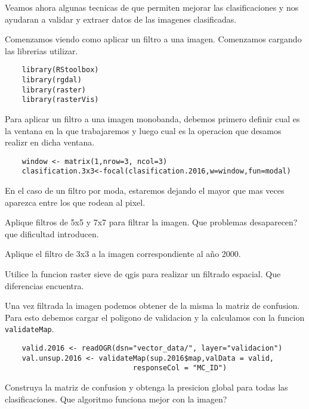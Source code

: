 Veamos ahora algunas tecnicas de que permiten mejorar las clasificaciones y nos
ayudaran a validar y extraer datos de las imagenes clasificadas.

Comenzamos viendo como aplicar un filtro a una imagen. Comenzamos cargando las
librerias utilizar.

\begin{lstlisting}
    library(RStoolbox)
    library(rgdal)
    library(raster)
    library(rasterVis)
\end{lstlisting}

Para aplicar un filtro a una imagen monobanda, debemos primero definir cual es
la ventana en la que trabajaremos y luego cual es la operacion que desamos
realizr en dicha ventana.

\begin{lstlisting}
    window <- matrix(1,nrow=3, ncol=3)
    clasification.3x3<-focal(clasification.2016,w=window,fun=modal)
\end{lstlisting}

En el caso de un filtro por moda, estaremos dejando el mayor que mas veces
aparezca entre los que rodean al pixel.

\begin{act}
    Aplique filtros de 5x5 y 7x7 para filtrar la imagen. Que problemas
    desaparecen? que dificultad introducen.
\end{act}

\begin{act}
    Aplique el filtro de 3x3 a la imagen correspondiente al año 2000.
\end{act}

\begin{act}
    Utilice la funcion raster sieve de qgis para realizar un filtrado espacial.
    Que diferencias encuentra.
\end{act}

Una vez filtrada la imagen podemos obtener de la misma la matriz de confusion.
Para esto debemos cargar el poligono de validacion y la calculamos con la
funcion \texttt{validateMap}.

\begin{lstlisting}
    valid.2016 <- readOGR(dsn="vector_data/", layer="validacion")
    val.unsup.2016 <- validateMap(sup.2016$map,valData = valid, 
                              responseCol = "MC_ID")
\end{lstlisting}

\begin{act}
    Construya la matriz de confusion y obtenga la presicion global para todas
    las clasificaciones. Que algoritmo funciona mejor con la imagen?
\end{act}

